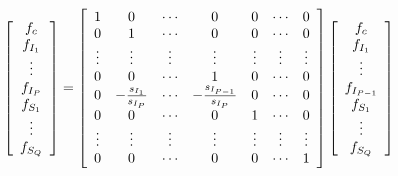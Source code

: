 \begin{equation}
    \left[
        \begin{array}{c}
            f_c     \\
            f_{I_1} \\
            \vdots  \\
            f_{I_P} \\
            f_{S_1} \\
            \vdots  \\
            f_{S_Q} \\
        \end{array}
        \right] =
    \left[
        \begin{array}{c ccc ccc}
            1      & 0                        & \cdots & 0                            & 0      & \cdots & 0      \\

            0      & 1                        & \cdots & 0                            & 0      & \cdots & 0      \\
            \vdots & \vdots                   & \vdots & \vdots                       & \vdots & \vdots & \vdots \\
            0      & 0                        & \cdots & 1                            & 0      & \cdots & 0      \\
            0      & -\frac{s_{I_1}}{s_{I_P}} & \cdots & -\frac{s_{I_{P-1}}}{s_{I_P}} & 0      & \cdots & 0      \\

            0      & 0                        & \cdots & 0                            & 1      & \cdots & 0      \\
            \vdots & \vdots                   & \vdots & \vdots                       & \vdots & \vdots & \vdots \\
            0      & 0                        & \cdots & 0                            & 0      & \cdots & 1      \\
        \end{array}
        \right]
    \left[
        \begin{array}{c}
            f_c         \\
            f_{I_1}     \\
            \vdots      \\
            f_{I_{P-1}} \\
            f_{S_1}     \\
            \vdots      \\
            f_{S_Q}     \\
        \end{array}
        \right]
\end{equation}

